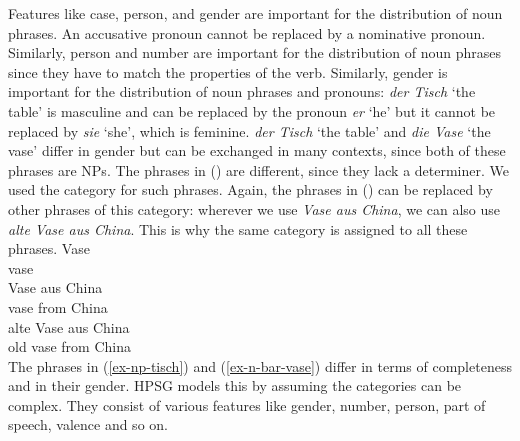 Features like case, person, and gender are important for the distribution of noun
phrases. An accusative pronoun cannot be replaced by a nominative pronoun. Similarly, person and
number are important for the distribution of noun phrases since they have to match the properties of
the verb. Similarly, gender is important for the distribution of noun phrases and pronouns:
\emph{der Tisch} `the table' is masculine and can be replaced by the pronoun \emph{er} `he' but it
cannot be replaced by \emph{sie} `she', which is feminine. \emph{der Tisch} `the table' and
\emph{die Vase} `the vase' differ in gender but can be exchanged in many contexts, since both of
these phrases are NPs. The phrases in () are different, since they lack a
determiner. We used the category \nbar for such phrases. Again, the phrases in () can be
replaced by other phrases of this category: wherever we use \emph{Vase aus China}, we can also use
\emph{alte Vase aus China}. This is why the same category is assigned to all these phrases.
\eal
\label{ex-n-bar-vase}
\ex 
\gll Vase\\
     vase\\
\ex 
\gll Vase aus China\\
     vase from China\\
\ex 
\gll alte Vase aus China\\
     old  vase from China\\
\zl
The phrases in (\ref{ex-np-tisch}) and (\ref{ex-n-bar-vase}) differ in terms of completeness and in
their gender. HPSG models this by assuming the categories can be complex. They consist of various
features like gender, number, person, part of speech, valence and so on.

